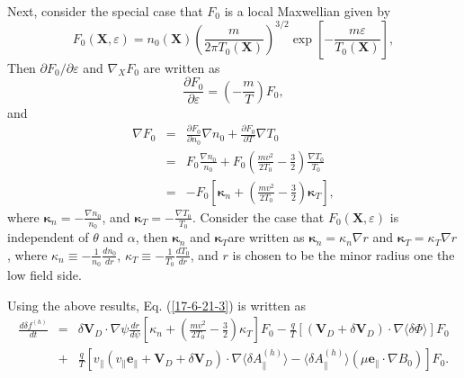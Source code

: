 \documentclass{llncs}
\newcommand{\tmmathbf}[1]{\ensuremath{\boldsymbol{#1}}}
\begin{document}
\

Next, consider the special case that $F_0$ is a local Maxwellian given by
\begin{equation}
  F_0 (\mathbf{X}, \varepsilon) = n_0 (\mathbf{X}) \left( \frac{m}{2 \pi T_0
  (\mathbf{X})} \right)^{3 / 2} \exp \left[ - \frac{m \varepsilon}{T_0
  (\mathbf{X})} \right],
\end{equation}
Then $\partial F_0 / \partial \varepsilon$ and $\nabla_X F_0$ are written as
\begin{equation}
  \label{17-7-16-1} \frac{\partial F_0}{\partial \varepsilon} = \left( -
  \frac{m}{T} \right) F_0,
\end{equation}
and
\begin{eqnarray}
  \nabla F_0 & = & \frac{\partial F_0}{\partial n_0} \nabla n_0 +
  \frac{\partial F_0}{\partial T} \nabla T_0 \nonumber\\
  & = & F_0 \frac{\nabla n_0}{n_0} + F_0 \left( \frac{m v^2}{2 T_0} -
  \frac{3}{2} \right) \frac{\nabla T_0}{T_0} \nonumber\\
  & = & - F_0 \left[ \tmmathbf{\kappa}_n + \left( \frac{m v^2}{2 T_0} -
  \frac{3}{2} \right) \tmmathbf{\kappa}_T \right],  \label{17-7-16-2}
\end{eqnarray}
where $\tmmathbf{\kappa}_n = - \frac{\nabla n_0}{n_0}$, and
$\tmmathbf{\kappa}_T = - \frac{\nabla T_0}{T_0}$. Consider the case that $F_0
(\mathbf{X}, \varepsilon)$ is independent of $\theta$ and $\alpha$, then
$\tmmathbf{\kappa}_n$ and $\tmmathbf{\kappa}_T $are written as
$\tmmathbf{\kappa}_n = \kappa_n \nabla r$ and $\tmmathbf{\kappa}_T = \kappa_T
\nabla r$, where $\kappa_n \equiv - \frac{1}{n_0}  \frac{d n_0}{d r}$,
$\kappa_T \equiv - \frac{1}{T_0} \frac{d T_0}{d r}$, and $r$ is chosen to be
the minor radius one the low field side.

Using the above results, Eq. (\ref{17-6-21-3}) is written as
\begin{eqnarray}
  \frac{d \delta f^{(h)}}{d t} & = & \delta \mathbf{V}_D \cdot \nabla \psi
  \frac{d r}{d \psi} \left[ \kappa_n + \left( \frac{m v^2}{2 T_0} -
  \frac{3}{2} \right) \kappa_T \right] F_0 - \frac{q}{T} [(\mathbf{V}_D +
  \delta \mathbf{V}_D) \cdot \nabla \langle \delta \Phi \rangle] F_0
  \nonumber\\
  & + & \frac{q}{T} [v_{\parallel} (v_{\parallel} \mathbf{e}_{\parallel}
  +\mathbf{V}_D + \delta \mathbf{V}_D) \cdot \nabla \langle \delta
  A_{\parallel}^{(h)} \rangle - \langle \delta A_{\parallel}^{(h)} \rangle
  (\mu \mathbf{e}_{\parallel} \cdot \nabla B_0)] F_0 .  \label{21-8-8-a1}
\end{eqnarray}
\end{document}
